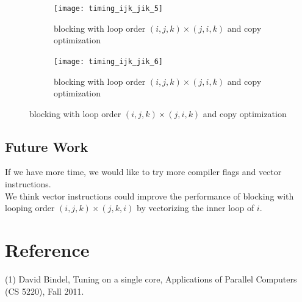 \documentclass[12pt]{article}
\numberwithin{equation}{section}
\begin{document}
\begin{figure}[!ht]
   \begin{subfigure}
      \centering
        \begin{center}
      \texttt{[image: timing\_ijk\_jik\_5]}
        \end{center}
      \label{aload0}
      \caption{blocking with loop order $(i, j, k)\times(j, i, k)$ and copy optimization}
  \end{subfigure}
  \begin{subfigure}
      \centering
        \begin{center}
      \texttt{[image: timing\_ijk\_jik\_6]}
        \end{center}
      \label{aload1}
      \caption{blocking with loop order $(i, j, k)\times(j, i, k)$ and copy optimization}
  \end{subfigure}

\end{figure}

\subsection{Future Work}

If we have more time, we would like to try more compiler flags and vector instructions.
\\
We think vector instructions could improve the performance of blocking with looping order $(i, j, k)\times(j, k, i)$ by vectorizing the inner loop of $i$.


\section*{Reference}

(1) David Bindel, Tuning on a single core, Applications of Parallel Computers (CS 5220), Fall 2011.
\end{document}
